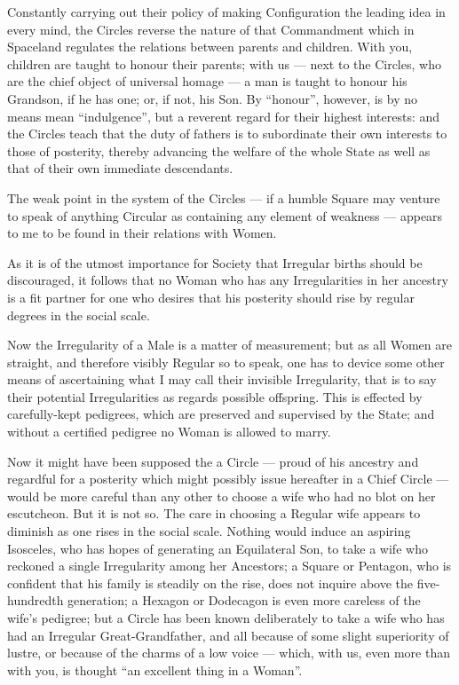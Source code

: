 \documentclass[12pt, a4paper, twoside]{memoir}
\begin{document}
Constantly carrying out their policy of making Configuration the leading idea
in every mind, the Circles reverse the nature of that Commandment which in
Spaceland regulates the relations between parents and children. With you,
children are taught to honour their parents; with us --- next to the Circles,
who are the chief object of universal homage --- a man is taught to honour his
Grandson, if he has one; or, if not, his Son. By ``honour'', however, is by no
means mean ``indulgence'', but a reverent regard for their highest interests:
and the Circles teach that the duty of fathers is to subordinate their own
interests to those of posterity, thereby advancing the welfare of the whole
State as well as that of their own immediate descendants.

The weak point in the system of the Circles --- if a humble Square may venture
to speak of anything Circular as containing any element of weakness --- appears
to me to be found in their relations with Women.

As it is of the utmost importance for Society that Irregular births should be
discouraged, it follows that no Woman who has any Irregularities in her
ancestry is a fit partner for one who desires that his posterity should rise
by regular degrees in the social scale.

Now the Irregularity of a Male is a matter of measurement; but as all Women
are straight, and therefore visibly Regular so to speak, one has to device
some other means of ascertaining what I may call their invisible Irregularity,
that is to say their potential Irregularities as regards possible offspring.
This is effected by carefully-kept pedigrees, which are preserved and
supervised by the State; and without a certified pedigree no Woman is allowed
to marry.

Now it might have been supposed the a Circle --- proud of his ancestry and
regardful for a posterity which might possibly issue hereafter in a Chief
Circle --- would be more careful than any other to choose a wife who had no blot
on her escutcheon. But it is not so. The care in choosing a Regular wife
appears to diminish as one rises in the social scale. Nothing would induce an
aspiring Isosceles, who has hopes of generating an Equilateral Son, to take a
wife who reckoned a single Irregularity among her Ancestors; a Square or
Pentagon, who is confident that his family is steadily on the rise, does not
inquire above the five-hundredth generation; a Hexagon or Dodecagon is even
more careless of the wife's pedigree; but a Circle has been known deliberately
to take a wife who has had an Irregular Great-Grandfather, and all because of
some slight superiority of lustre, or because of the charms of a low voice ---
which, with us, even more than with you, is thought ``an excellent thing in a
Woman''.
\end{document}
